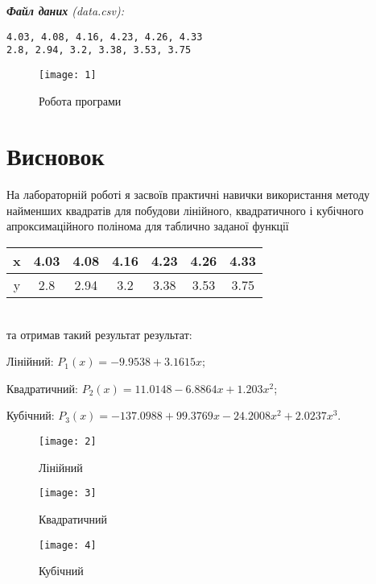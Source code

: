 \documentclass{article}
\begin{document}
\begin{large}
		\noindent\textit{\textbf{Файл даних} (data.csv):}
		\begin{lstlisting}
4.03, 4.08, 4.16, 4.23, 4.26, 4.33
2.8, 2.94, 3.2, 3.38, 3.53, 3.75\end{lstlisting}
		
		\begin{figure}[h!]
			\centering
			\texttt{[image: 1]}
			\caption{Робота програми}
		\end{figure}
		
		\section*{Висновок}
		На лабораторній роботі я засвоїв практичні навички використання методу найменших квадратів для побудови лінійного, квадратичного і
		кубічного апроксимаційного полінома для таблично заданої функції
		
		\begin{tabular}{|c|c|c|c|c|c|c|}
			\hline
			x & 4.03 & 4.08 & 4.16 & 4.23 & 4.26 & 4.33\\
			\hline
			y & 2.8 & 2.94 & 3.2 & 3.38 & 3.53 & 3.75\\
			\hline
		\end{tabular}
		\vspace{5pt}\\
		та отримав такий результат результат:
		\begin{list}{}{}
			\item [Лінійний:] $P_1(x) = -9.9538 + 3.1615x$;
			\item [Квадратичний:] $P_2(x) = 11.0148 - 6.8864x + 1.203x^2$;
			\item [Кубічний:] $P_3(x) = -137.0988 + 99.3769x - 24.2008x^2 + 2.0237x^3$.
		\end{list}
		\begin{figure}[!htb]
			\texttt{[image: 2]}
			\caption{Лінійний}\label{fig:2}
			\endminipage\hfill
			\texttt{[image: 3]}
			\caption{Квадратичний}\label{fig:3}
			\endminipage\hfill
			\texttt{[image: 4]}
			\caption{Кубічний}\label{fig:4}
			\endminipage
		\end{figure}

	\end{large}
\end{document}
